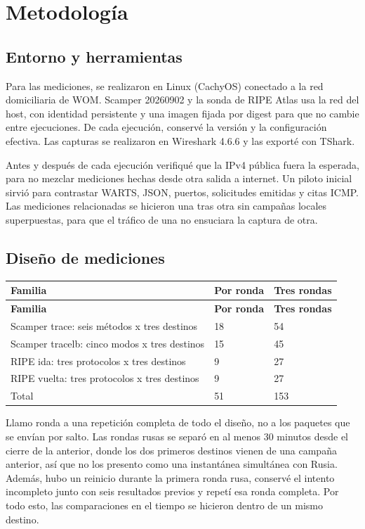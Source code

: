 \section{Metodología}\label{sec:metodo}
\subsection{Entorno y herramientas}

Para las mediciones, se realizaron en Linux (CachyOS) conectado a la red domiciliaria de WOM. Scamper 20260902 y la sonda de RIPE Atlas usa la red del host, con identidad persistente y una imagen fijada por digest para que no cambie entre ejecuciones. De cada ejecución, conservé la versión y la configuración efectiva. Las capturas se realizaron en Wireshark 4.6.6 y las exporté con TShark.

Antes y después de cada ejecución verifiqué que la IPv4 pública fuera la esperada, para no mezclar mediciones hechas desde otra salida a internet. Un piloto inicial sirvió para contrastar WARTS, JSON, puertos, solicitudes emitidas y citas ICMP. Las mediciones relacionadas se hicieron una tras otra sin campañas locales superpuestas, para que el tráfico de una no ensuciara la captura de otra.


\subsection{Diseño de mediciones}
\begingroup
\fontsize{9}{11}\selectfont
\addtocounter{table}{-1}
\begin{longtable}{p{10cm}p{2cm}p{2cm}}
\toprule
\textbf{Familia} & \textbf{Por ronda} & \textbf{Tres rondas} \\ \midrule
\endfirsthead
\toprule
\textbf{Familia} & \textbf{Por ronda} & \textbf{Tres rondas} \\ \midrule
\endhead
Scamper trace: seis métodos x tres destinos & 18 & 54 \\
Scamper tracelb: cinco modos x tres destinos & 15 & 45 \\
RIPE ida: tres protocolos x tres destinos & 9 & 27 \\
RIPE vuelta: tres protocolos x tres destinos & 9 & 27 \\
Total & 51 & 153 \\
\bottomrule
\end{longtable}
\endgroup

Llamo ronda a una repetición completa de todo el diseño, no a los paquetes que se envían por salto. Las rondas rusas se separó en al menos 30 minutos desde el cierre de la anterior, donde los dos primeros destinos vienen de una campaña anterior, así que no los presento como una instantánea simultánea con Rusia. Además, hubo un reinicio durante la primera ronda rusa, conservé el intento incompleto junto con seis resultados previos y repetí esa ronda completa. Por todo esto, las comparaciones en el tiempo se hicieron dentro de un mismo destino.



